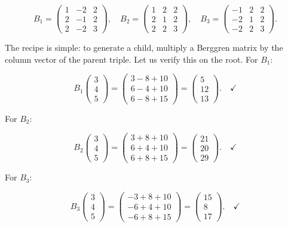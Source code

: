 \[
B_1 = \begin{pmatrix} 1 & -2 & 2 \\ 2 & -1 & 2 \\ 2 & -2 & 3 \end{pmatrix}, \quad B_2 = \begin{pmatrix} 1 & 2 & 2 \\ 2 & 1 & 2 \\ 2 & 2 & 3 \end{pmatrix}, \quad B_3 = \begin{pmatrix} -1 & 2 & 2 \\ -2 & 1 & 2 \\ -2 & 2 & 3 \end{pmatrix}.
\]

The recipe is simple: to generate a child, multiply a Berggren matrix by the column vector of the parent triple. Let us verify this on the root. For $B_1$:

\[
B_1 \begin{pmatrix} 3 \\ 4 \\ 5 \end{pmatrix} = \begin{pmatrix} 3 - 8 + 10 \\ 6 - 4 + 10 \\ 6 - 8 + 15 \end{pmatrix} = \begin{pmatrix} 5 \\ 12 \\ 13 \end{pmatrix}. \quad \checkmark
\]

For $B_2$:

\[
B_2 \begin{pmatrix} 3 \\ 4 \\ 5 \end{pmatrix} = \begin{pmatrix} 3 + 8 + 10 \\ 6 + 4 + 10 \\ 6 + 8 + 15 \end{pmatrix} = \begin{pmatrix} 21 \\ 20 \\ 29 \end{pmatrix}. \quad \checkmark
\]

For $B_3$:

\[
B_3 \begin{pmatrix} 3 \\ 4 \\ 5 \end{pmatrix} = \begin{pmatrix} -3 + 8 + 10 \\ -6 + 4 + 10 \\ -6 + 8 + 15 \end{pmatrix} = \begin{pmatrix} 15 \\ 8 \\ 17 \end{pmatrix}. \quad \checkmark
\]

